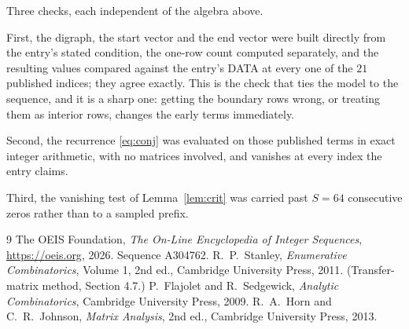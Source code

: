 \documentclass[11pt,a4paper]{article}
\theoremstyle{plain}
\theoremstyle{definition}
\begin{document}
Three checks, each independent of the algebra above.

First, the digraph, the start vector and the end vector were built directly from the
entry's stated condition, the one-row count computed separately, and the resulting values
compared against the entry's DATA at every one of the $21$ published indices; they
agree exactly. This is the check that ties the model to the sequence, and it is a sharp one:
getting the boundary rows wrong, or treating them as interior rows, changes the early terms
immediately.

Second, the recurrence \eqref{eq:conj} was evaluated on those published terms in exact
integer arithmetic, with no matrices involved, and vanishes at every index the entry claims.

Third, the vanishing test of Lemma~\ref{lem:crit} was carried past $S=64$ consecutive
zeros rather than to a sampled prefix.

\begin{thebibliography}{9}
 The OEIS Foundation, \emph{The On-Line Encyclopedia of Integer
Sequences}, \url{https://oeis.org}, 2026. Sequence A304762.
 R.~P.~Stanley, \emph{Enumerative Combinatorics}, Volume 1, 2nd ed.,
Cambridge University Press, 2011. (Transfer-matrix method, Section 4.7.)
 P.~Flajolet and R.~Sedgewick, \emph{Analytic Combinatorics}, Cambridge
University Press, 2009.
 R.~A.~Horn and C.~R.~Johnson, \emph{Matrix Analysis}, 2nd ed., Cambridge
University Press, 2013.
\end{thebibliography}
\end{document}
